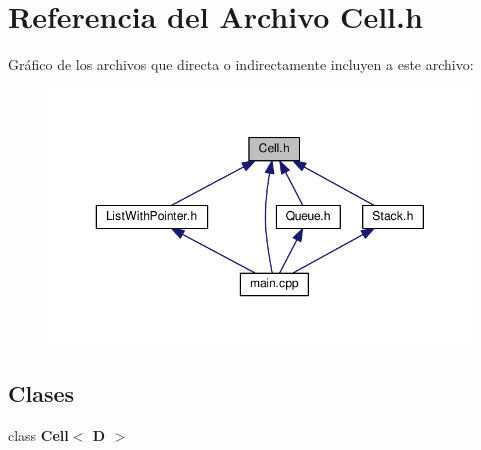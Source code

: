 \section{Referencia del Archivo Cell.\-h}
\label{_cell_8h}
Gráfico de los archivos que directa o indirectamente incluyen a este archivo\-:\nopagebreak
\begin{figure}[H]
\begin{center}
\leavevmode
\includegraphics[width=350pt]{_cell_8h__dep__incl}
\end{center}
\end{figure}
\subsection*{Clases}
\begin{DoxyCompactItemize}
\item 
class {\bf Cell$<$ D $>$}
\end{DoxyCompactItemize}
